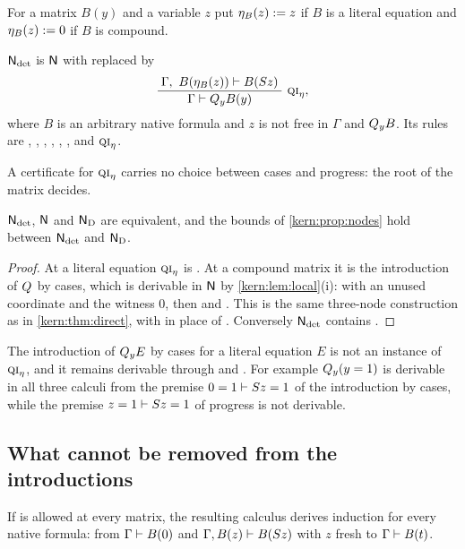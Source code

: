For a matrix $B(y)$ and a variable $z$ put $\eta_B(z)\mathrel{:=} z$ if $B$ is a
literal equation and $\eta_B(z)\mathrel{:=} 0$ if $B$ is compound.

\begin{definition}
\label{kern:def:Ndet}
$\mathsf{N}_{\det}$ is $\mathsf{N}$ with  replaced by
\[
 \infrule{\Gamma,\ B(\eta_B(z))\proves B(\Suc z)}
         {\Gamma\proves\Q{y}B(y)}\ \rulename{QI}_{\eta},
\]
where $B$ is an arbitrary native formula and $z$ is not free in $\Gamma$ and
$Q_{y}B$.  Its rules are , , ,
, , ,  and
$\rulename{QI}_{\eta}$.
\end{definition}

A certificate for $\rulename{QI}_{\eta}$ carries no choice between cases and
progress: the root of the matrix decides.

\begin{corollary}
\label{kern:cor:det}
$\mathsf{N}_{\det}$, $\mathsf{N}$ and $\mathsf{N}_{\mathrm{D}}$ are equivalent, and the bounds
of \cref{kern:prop:nodes} hold between $\mathsf{N}_{\det}$ and $\mathsf{N}_{\mathrm{D}}$.
\end{corollary}

\begin{proof}
At a literal equation $\rulename{QI}_{\eta}$ is .  At a compound
matrix it is the introduction of $Q_{}$ by cases, which is derivable in $\mathsf{N}$
by \cref{kern:lem:local}(i):  with an unused coordinate and the
witness $0$, then  and .  This is the same
three-node construction as in \cref{kern:thm:direct}, with  in
place of .  Conversely $\mathsf{N}_{\det}$ contains .
\end{proof}

The introduction of $Q_{y}E$ by cases for a literal equation $E$ is not an
instance of $\rulename{QI}_{\eta}$, and it remains derivable through
 and .  For example $Q_{y}(y=1)$ is derivable in
all three calculi from the premise $0=1\vdash S z=1$ of the introduction
by cases, while the premise $z=1\vdash S z=1$ of progress is not
derivable.

\subsection{What cannot be removed from the introductions}
\label{kern:sec:introlimits}

\begin{proposition}
\label{kern:prop:guard}
If  is allowed at every matrix, the resulting calculus derives
induction for every native formula: from $\Gamma\vdash B(0)$ and
$\Gamma,B(z)\vdash B(S z)$ with $z$ fresh to $\Gamma\vdash B(t)$.
\end{proposition}

